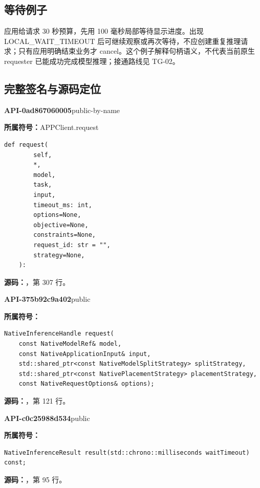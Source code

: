 \subsection{等待例子}
应用给请求 30 秒预算，先用 100 毫秒局部等待显示进度。出现 LOCAL\_WAIT\_TIMEOUT 后可继续观察或再次等待，不应创建重复推理请求；只有应用明确结束业务才 cancel。这个例子解释句柄语义，不代表当前原生 requester 已能成功完成模型推理；接通路线见 TG-02。

\subsection{完整签名与源码定位}

\textbf{API-0ad867060005}\quad public-by-name\par
\textbf{所属符号：}APPClient.request\par
\begin{Verbatim}[fontsize=\footnotesize,breaklines,breakanywhere]
def request(
        self,
        *,
        model,
        task,
        input,
        timeout_ms: int,
        options=None,
        objective=None,
        constraints=None,
        request_id: str = "",
        strategy=None,
    ):
\end{Verbatim}
\textbf{源码：}，第 307 行。\par

\textbf{API-375b92c9a402}\quad public\par
\textbf{所属符号：}\par
\begin{Verbatim}[fontsize=\footnotesize,breaklines,breakanywhere]
NativeInferenceHandle request(
    const NativeModelRef& model,
    const NativeApplicationInput& input,
    std::shared_ptr<const NativeModelSplitStrategy> splitStrategy,
    std::shared_ptr<const NativePlacementStrategy> placementStrategy,
    const NativeRequestOptions& options);
\end{Verbatim}
\textbf{源码：}，第 121 行。\par

\textbf{API-c0c25988d534}\quad public\par
\textbf{所属符号：}\par
\begin{Verbatim}[fontsize=\footnotesize,breaklines,breakanywhere]
NativeInferenceResult result(std::chrono::milliseconds waitTimeout) const;
\end{Verbatim}
\textbf{源码：}，第 95 行。\par

